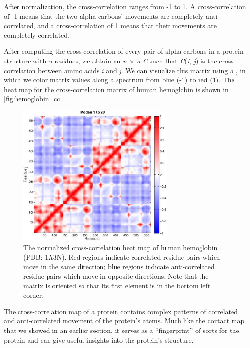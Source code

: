After normalization, the cross-correlation ranges from -1 to 1. A cross-correlation of -1 means that the two alpha carbons' movements are completely anti-correlated, and a cross-correlation of 1 means that their movements are completely correlated.

After computing the cross-correlation of every pair of alpha carbons in a protein structure with \textit{n} residues, we obtain an \textit{n} × \textit{n}  \textit{C} such that \textit{C}(\textit{i}, \textit{j}) is the cross-correlation between amino acids \textit{i} and \textit{j}. We can visualize this matrix using a , in which we color matrix values along a spectrum from blue (-1) to red (1). The heat map for the cross-correlation matrix of human hemoglobin is shown in \autoref{fig:hemoglobin_cc}.

\begin{figure}[h]
	\centering
	\mySfFamily
	\includegraphics[width = 0.7\textwidth]{../images/hemoglobin_cc.png}
	\caption{The normalized cross-correlation heat map of human hemoglobin (PDB: 1A3N). Red regions indicate correlated residue pairs which move in the same direction; blue regions indicate anti-correlated residue pairs which move in opposite directions. Note that the matrix is oriented so that its first element is in the bottom left corner.}
	\label{fig:hemoglobin_cc}
\end{figure}

The cross-correlation map of a protein contains complex patterns of correlated and anti-correlated movement of the protein's atoms. Much like the contact map that we showed in an earlier section, it serves as a ``fingerprint'' of sorts for the protein and can give useful insights into the protein's structure.

